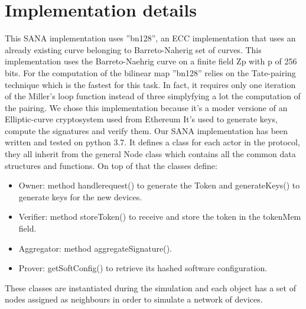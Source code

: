 \section{Implementation details}


This SANA implementation uses ''bn128'', an ECC implementation that uses an already existing curve belonging to Barreto-Naherig set of curves.
This implementation uses the Barreto-Naehrig curve on a finite field Zp with p of 256 bits.
For the computation of the bilinear map ''bn128'' relies on the Tate-pairing technique which is the fastest for this task. In fact, it requires only one iteration of the Miller's loop function instead of three simplyfying a lot the computation of the pairing.
We chose this implementation because it's a moder versione of an Elliptic-curve cryptosystem used from Ethereum
It's used to generate keys, compute the signatures and verify them.
Our SANA implementation has been written and tested on python 3.7.
It defines a class for each actor in the protocol, they all inherit from the general Node class which contains all the common data structures and functions.
On top of that the classes define:
\begin{itemize}
    \item Owner: method handlerequest() to generate the Token and generateKeys() to generate keys for the new devices.
    \item Verifier: method storeToken() to receive and store the token in the tokenMem field.
    \item Aggregator: method aggregateSignature().
    \item Prover: getSoftConfig() to retrieve its hashed software configuration.
\end{itemize}
These classes are instantiated during the simulation and each object has a set of nodes assigned as neighbours in order to simulate a network of devices.